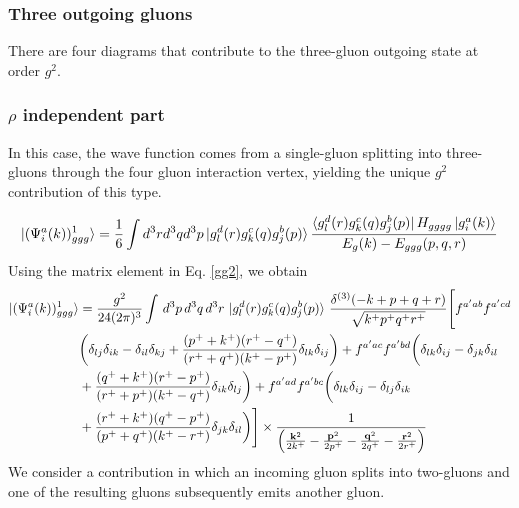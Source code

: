 \documentclass[a4paper,11pt]{article}
\def\v#1{\mathbf{#1}}
\begin{document}
\subsubsection{Three outgoing gluons}
There are four diagrams that contribute to the three-gluon outgoing state at order $g^{2}$. 

\subsubsection*{$\rho$ independent part}
In this case, the wave function comes from a single-gluon splitting into three-gluons through the four gluon interaction vertex, yielding the unique $g^{2}$ contribution of this type.

\begin{figure}[htbp]
    \centering
\end{figure}
\begin{equation}
    \ket{(\Psi^{a}_{i}(k))^{1}_{ggg}}  = \frac{1}{6}\int d^{3}r d^{3}q d^{3}p\ket{g^{d}_{l}(r)g^{c}_{k}(q)g^{b}_{j}(p)}\frac{\bra{g^{d}_{l}(r)g^{c}_{k}(q)g^{b}_{j}(p)}H_{gggg}\ket{g^{a}_{i}(k)}}{E_{g}(k)-E_{ggg}(p,q,r)}
\end{equation}
Using the matrix element in Eq. \eqref{gg2}, we obtain
\begin{align}
     \ket{(\Psi^{a}_{i}(k))^{1}_{ggg}} &  = \frac{g^{2}}{24(2\pi)^{3}}\int\, d^{3}p\, d^{3}q\, d^{3}r\, \ket{g^{d}_{l}(r)g^{c}_{k}(q)g^{b}_{j}(p)}\, \frac{\delta^{(3)}(-k+p+q+r)}{\sqrt{k^{+}p^{+}q^{+}r^{+}}}\Bigg[f^{a'ab}f^{a'cd}\notag \\ & \bigg(\delta_{lj}\delta_{ik}-\delta_{il}\delta_{kj} +\frac{(p^{+}+k^{+})(r^{+}-q^{+})}{(r^{+}+q^{+})(k^{+}-p^{+})}\delta_{lk}\delta_{ij}\bigg) +f^{a'ac}f^{a'bd}\bigg(\delta_{lk}\delta_{ij}-\delta_{jk}\delta_{il} \notag \\ & +\frac{(q^{+}+k^{+})(r^{+}-p^{+})}{(r^{+}+p^{+})(k^{+}-q^{+})}\delta_{ik}\delta_{lj}\bigg) +f^{a'ad}f^{a'bc}\bigg(\delta_{lk}\delta_{ij}-\delta_{lj}\delta_{ik}  \notag \\ & +\frac{(r^{+}+k^{+})(q^{+}-p^{+})}{(p^{+}+q^{+})(k^{+}-r^{+})}\delta_{jk}\delta_{il}\bigg)\Bigg]\times \frac{1}{\left(\frac{\v{k}^{2}}{2k^{+}}-\frac{\v{p}^{2}}{2p^{+}}-\frac{\v{q}^{2}}{2q^{+}}-\frac{\v{r}^{2}}{2r^{+}}\right)}
\end{align}
We consider a contribution in which an incoming gluon splits into two-gluons and one of the resulting gluons subsequently emits another gluon.
\end{document}
